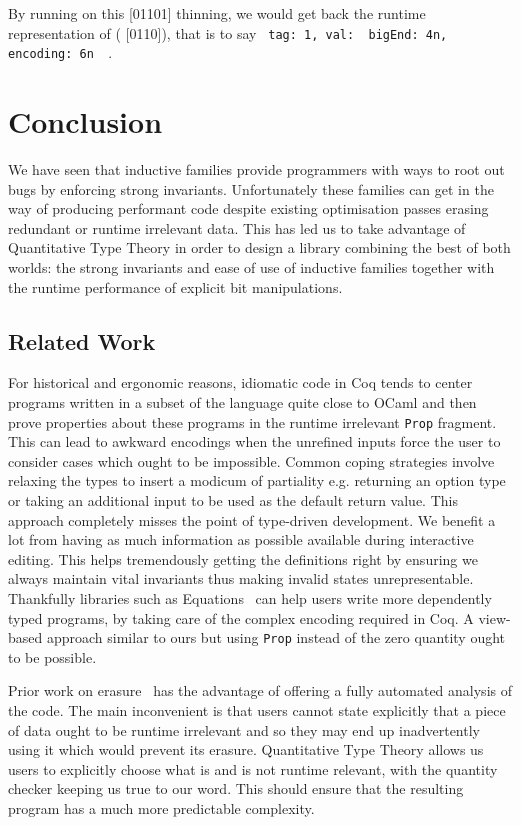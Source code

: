 \documentclass{article}
\newcommand{\coq}{Coq}
\begin{document}
By running  on this [01101] thinning, we would get
back the runtime representation of ( [0110]), that is to say
\texttt{{ tag: 1, val: { bigEnd: 4n, encoding: 6n } }}.

\section{Conclusion}

We have seen that inductive families provide programmers with ways to root out bugs
by enforcing strong invariants. Unfortunately these families can get in the way of
producing performant code despite existing optimisation passes erasing redundant
or runtime irrelevant data.
%
This has led us to take advantage of Quantitative Type Theory in order to design a library
combining the best of both worlds: the strong invariants and ease of use of inductive
families together with the runtime performance of explicit bit manipulations.

\subsection{Related Work}

For historical and ergonomic reasons, idiomatic code in \coq{} tends to center programs
written in a subset of the language quite close to OCaml and then prove properties
about these programs in the runtime irrelevant \texttt{Prop} fragment.
%
This can lead to awkward encodings when the unrefined inputs force the user to consider
cases which ought to be impossible. Common coping strategies involve relaxing the types
to insert a modicum of partiality e.g. returning an option type or taking an additional
input to be used as the default return value.
%
This approach completely misses the point of type-driven development. We benefit a lot
from having as much information as possible available during interactive editing. This
helps tremendously getting the definitions right by ensuring we always maintain vital
invariants thus making invalid states unrepresentable.
%
Thankfully libraries such as Equations~\cite{DBLP:conf/itp/Sozeau10,DBLP:journals/pacmpl/SozeauM19}
can help users write more dependently typed programs, by taking care of the complex
encoding required in \coq{}. A view-based approach similar to ours but using \texttt{Prop}
instead of the zero quantity ought to be possible.

Prior work on erasure~\cite{DBLP:journals/pacmpl/Tejiscak20} has the advantage of
offering a fully automated analysis of the code. The main inconvenient is that users
cannot state explicitly that a piece of data ought to be runtime irrelevant and so
they may end up inadvertently using it which would prevent its erasure.
%
Quantitative Type Theory allows us users to explicitly choose what is and is not
runtime relevant, with the quantity checker keeping us true to our word.
%
This should ensure that the resulting program has a much more predictable complexity.
\end{document}
